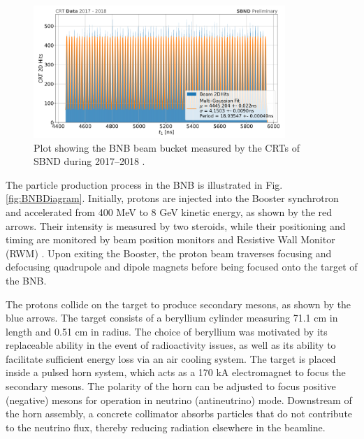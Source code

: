 \begin{figure}[ht!] 
\centering    
\includegraphics[width=0.85\textwidth]{CRT2017}
\caption[BNB Beam Bucket Measured by SBND CRTs in 2017-2018]{
Plot showing the BNB beam bucket measured by the CRTs of SBND during 2017--2018 \cite{CPAD2022}.
}
\label{fig:CRT2017}
\end{figure}

The particle production process in the BNB is illustrated in Fig. \ref{fig:BNBDiagram}.
Initially, protons are injected into the Booster synchrotron and accelerated from 400 MeV to 8 GeV kinetic energy, as shown by the red arrows. 
Their intensity is measured by two steroids, while their positioning and timing are monitored by beam position monitors and Resistive Wall Monitor (RWM) \cite{BNBRWM}.
Upon exiting the Booster, the proton beam traverses focusing and defocusing quadrupole and dipole magnets before being focused onto the target of the BNB.

The protons collide on the target to produce secondary mesons, as shown by the blue arrows.
The target consists of a beryllium cylinder measuring 71.1 cm in length and 0.51 cm in radius.
The choice of beryllium was motivated by its replaceable ability in the event of radioactivity issues, as well as its ability to facilitate sufficient energy loss via an air cooling system.
The target is placed inside a pulsed horn system, which acts as a 170 kA electromagnet to focus the secondary mesons.
The polarity of the horn can be adjusted to focus positive (negative) mesons for operation in neutrino (antineutrino) mode. 
Downstream of the horn assembly, a concrete collimator absorbs particles that do not contribute to the neutrino flux, thereby reducing radiation elsewhere in the beamline.

